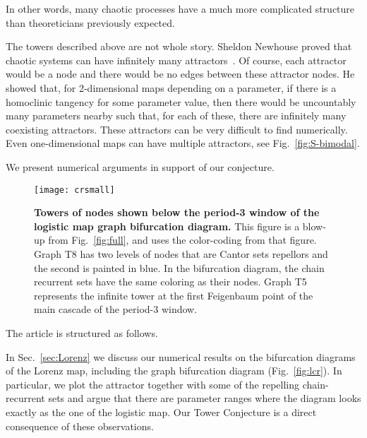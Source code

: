 \documentclass{article}
\def\INT{_\text{Int}}
\newcommand{\jim}{\color{black} }
\begin{document}
In other words, many chaotic processes have a much more complicated structure than theoreticians previously expected.

{\jim 
The towers described above are not whole story. Sheldon Newhouse proved that chaotic systems can have infinitely many attractors~\cite{New74,Rob83}. 
Of course, each attractor would be a node and there would be no edges between these attractor nodes. 
He showed that, for 2-dimensional maps depending on a parameter, if there is a homoclinic tangency for some parameter value, then there would be uncountably many parameters nearby such that, for each of these, there are infinitely many coexisting attractors. 
These attractors can be very difficult to find numerically.
Even one-dimensional maps can have multiple attractors, see Fig.~\ref{fig:S-bimodal}.
}

We present numerical arguments in support of our conjecture.

\begin{figure}
 \centering
 \texttt{[image: crsmall]}
 \caption{{\bf Towers of nodes shown below the period-3 window of the logistic map graph bifurcation diagram.}
    This figure is a blow-up from Fig.~\ref{fig:full}, and uses the color-coding from that figure. Graph T8 has two levels of nodes that are Cantor sets repellors and the second is painted in blue.
In the bifurcation diagram, the chain recurrent sets have the same coloring as their nodes. 
Graph T5 represents the infinite tower at the first Feigenbaum point of the main cascade of the period-3 window. 
}
 \label{fig:p3}
\end{figure} 

The article is structured as follows. 

In Sec.~\ref{sec:Lorenz} we discuss our numerical results on the bifurcation diagrams of the Lorenz map, including the graph bifurcation diagram (Fig.~\ref{fig:lcr}). In particular, we plot the attractor together with some of the repelling chain-recurrent sets and argue that there are parameter ranges where the diagram looks exactly as the one of the logistic map. Our Tower Conjecture is a direct consequence of these observations.
\end{document}
